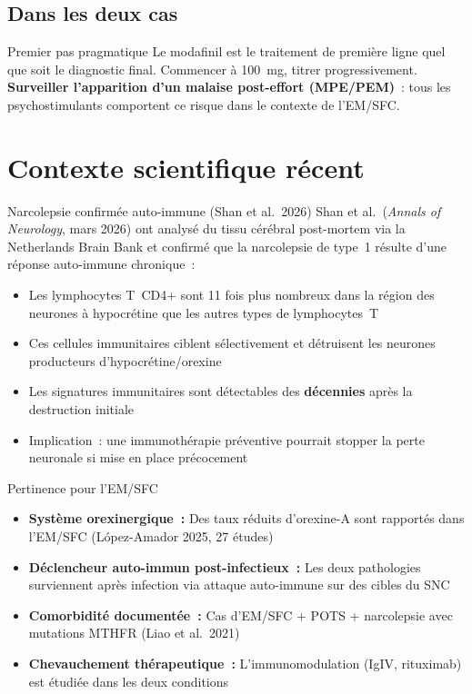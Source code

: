 \documentclass[11pt,a4paper]{article}
\begin{document}
\subsection{Dans les deux cas}

\begin{keyfinding}{Premier pas pragmatique}
Le modafinil est le traitement de première ligne quel que soit le diagnostic final. Commencer à 100~mg, titrer progressivement. \textbf{Surveiller l'apparition d'un malaise post-effort (MPE/PEM)}~: tous les psychostimulants comportent ce risque dans le contexte de l'EM/SFC.
\end{keyfinding}

\section{Contexte scientifique récent}
\label{sec:contexte-scientifique}

\begin{mechanism}{Narcolepsie confirmée auto-immune (Shan et al.\ 2026)}
Shan et al.\ (\textit{Annals of Neurology}, mars 2026) ont analysé du tissu cérébral post-mortem via la Netherlands Brain Bank et confirmé que la narcolepsie de type~1 résulte d'une réponse auto-immune chronique~:

\begin{itemize}[nosep]
    \item Les lymphocytes T~CD4+ sont 11 fois plus nombreux dans la région des neurones à hypocrétine que les autres types de lymphocytes~T
    \item Ces cellules immunitaires ciblent sélectivement et détruisent les neurones producteurs d'hypocrétine/orexine
    \item Les signatures immunitaires sont détectables des \textbf{décennies} après la destruction initiale
    \item Implication~: une immunothérapie préventive pourrait stopper la perte neuronale si mise en place précocement
\end{itemize}
\end{mechanism}

\begin{mechanism}{Pertinence pour l'EM/SFC}
\begin{itemize}[nosep]
    \item \textbf{Système orexinergique~:} Des taux réduits d'orexine-A sont rapportés dans l'EM/SFC (López-Amador 2025, 27 études)
    \item \textbf{Déclencheur auto-immun post-infectieux~:} Les deux pathologies surviennent après infection via attaque auto-immune sur des cibles du SNC
    \item \textbf{Comorbidité documentée~:} Cas d'EM/SFC + POTS + narcolepsie avec mutations MTHFR (Liao et al.\ 2021)
    \item \textbf{Chevauchement thérapeutique~:} L'immunomodulation (IgIV, rituximab) est étudiée dans les deux conditions
\end{itemize}
\end{mechanism}
\end{document}
